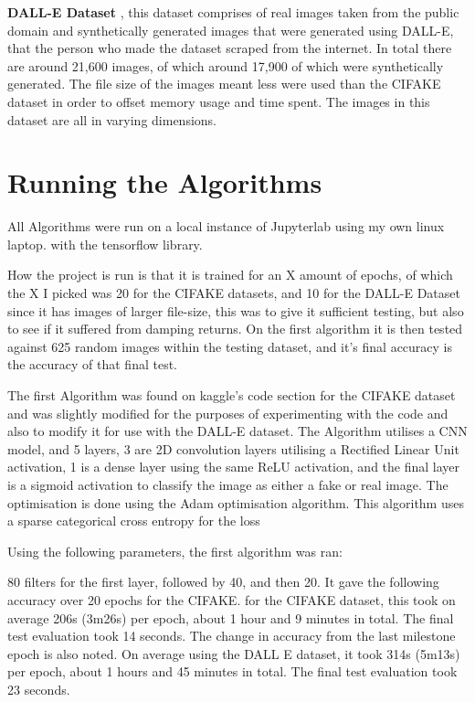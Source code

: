 \documentclass[12pt,letter]{article}
\begin{document}
\textbf{DALL-E Dataset} \cite{unknown2024}, this dataset comprises of real images taken from the public domain and synthetically generated images that were generated using DALL-E, that the person who made the dataset scraped from the internet. In total there are around 21,600 images, of which around 17,900 of which were synthetically generated. The file size of the images meant less were used than the CIFAKE dataset in order to offset memory usage and time spent. The images in this dataset are all in varying dimensions.

\section{Running the Algorithms}

All Algorithms were run on a local instance of Jupyterlab using my own linux laptop. with the tensorflow library. 

How the project is run is that it is trained for an X amount of epochs, of which the X I picked was 20 for the CIFAKE datasets, and 10 for the DALL-E Dataset since it has images of larger file-size, this was to give it sufficient testing, but also to see if it suffered from damping returns. On the first algorithm it is then tested against 625 random images within the testing dataset, and it's final accuracy is the accuracy of that final test.

The first Algorithm was found on kaggle's code section for the CIFAKE dataset \cite{upretid2023} and was slightly modified for the purposes of experimenting with the code and also to modify it for use with the DALL-E dataset.
The Algorithm utilises a CNN model, and 5 layers, 3 are 2D convolution layers utilising a Rectified Linear Unit activation, 1 is a dense layer using the same ReLU activation, and the final layer is a sigmoid activation to classify the image as either a fake or real image. The optimisation is done using the Adam optimisation algorithm. This algorithm uses a sparse categorical cross entropy for the loss

Using the following parameters, the first algorithm was ran:

80 filters for the first layer, followed by 40, and then 20. It gave the following accuracy over 20 epochs for the CIFAKE. for the CIFAKE dataset, this took on average 206s (3m26s) per epoch, about 1 hour and 9 minutes in total. The final test evaluation took 14 seconds. The change in accuracy from the last milestone epoch is also noted. On average using the DALL E dataset, it took 314s (5m13s) per epoch, about 1 hours and 45 minutes in total. The final test evaluation took 23 seconds. 
\end{document}
